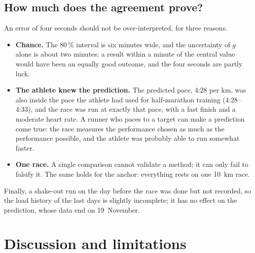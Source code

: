 \documentclass[11pt,a4paper]{article}
\begin{document}
\subsection{How much does the agreement prove?}
An error of four seconds should not be over-interpreted, for three reasons.
\begin{itemize}
\item \textbf{Chance.} The 80\,\% interval is six minutes wide, and the uncertainty
of $g$ alone is about two minutes: a result within a minute of the central value
would have been an equally good outcome, and the four seconds are partly luck.
\item \textbf{The athlete knew the prediction.} The predicted pace, 4:28 per km,
was also inside the pace the athlete had used for half-marathon training
(4:28--4:33), and the race was run at exactly that pace, with a fast finish and a
moderate heart rate. A runner who paces to a target can make a prediction come
true: the race measures the performance chosen as much as the performance
possible, and the athlete was probably able to run somewhat faster.
\item \textbf{One race.} A single comparison cannot validate a method; it can
only fail to falsify it. The same holds for the anchor: everything rests on one
\SI{10}{km} race.
\end{itemize}
Finally, a shake-out run on the day before the race was done but not recorded,
so the load history of the last days is slightly incomplete; it has no effect on
the prediction, whose data end on 19~November.


\section{Discussion and limitations}\label{sec:discussion}
\end{document}
